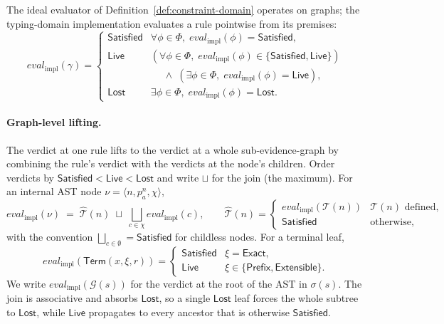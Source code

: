 The ideal evaluator of Definition~\ref{def:constraint-domain} operates on graphs; the typing-domain implementation evaluates a rule pointwise from its premises:
\[
	\mathit{eval}_{\mathrm{impl}}(\gamma) =
	\begin{cases}
		\mathsf{Satisfied} & \forall \phi \in \Phi,\; \mathit{eval}_{\mathrm{impl}}(\phi) = \mathsf{Satisfied},                      \\
		\mathsf{Live}      & (\forall \phi \in \Phi,\; \mathit{eval}_{\mathrm{impl}}(\phi) \in \{\mathsf{Satisfied},\mathsf{Live}\}) \\
		                   & \quad\;\land\; (\exists \phi \in \Phi,\; \mathit{eval}_{\mathrm{impl}}(\phi) = \mathsf{Live}),          \\
		\mathsf{Lost}      & \exists \phi \in \Phi,\; \mathit{eval}_{\mathrm{impl}}(\phi) = \mathsf{Lost}.
	\end{cases}
\]

\paragraph{Graph-level lifting.}
The verdict at one rule lifts to the verdict at a whole sub-evidence-graph by combining the rule's verdict with the verdicts at the node's children. Order verdicts by $\mathsf{Satisfied} < \mathsf{Live} < \mathsf{Lost}$ and write $\sqcup$ for the join (the maximum). For an internal AST node $\nu = \langle n, p^n_a, \chi \rangle$,
\[
	\mathit{eval}_{\mathrm{impl}}(\nu) \;=\;
	\widehat{\mathcal T}(n) \;\sqcup\; \bigsqcup_{c \in \chi} \mathit{eval}_{\mathrm{impl}}(c),
	\qquad
	\widehat{\mathcal T}(n) =
	\begin{cases}
		\mathit{eval}_{\mathrm{impl}}(\mathcal T(n)) & \mathcal T(n) \text{ defined}, \\
		\mathsf{Satisfied}                           & \text{otherwise},
	\end{cases}
\]
with the convention $\bigsqcup_{c \in \emptyset} = \mathsf{Satisfied}$ for childless nodes. For a terminal leaf,
\[
	\mathit{eval}_{\mathrm{impl}}(\mathsf{Term}(x,\xi,r)) =
	\begin{cases}
		\mathsf{Satisfied} & \xi = \mathsf{Exact},                             \\
		\mathsf{Live}      & \xi \in \{\mathsf{Prefix}, \mathsf{Extensible}\}.
	\end{cases}
\]
We write $\mathit{eval}_{\mathrm{impl}}(\mathcal G(s))$ for the verdict at the root of the AST in $\sigma(s)$. The join is associative and absorbs $\mathsf{Lost}$, so a single $\mathsf{Lost}$ leaf forces the whole subtree to $\mathsf{Lost}$, while $\mathsf{Live}$ propagates to every ancestor that is otherwise $\mathsf{Satisfied}$.

